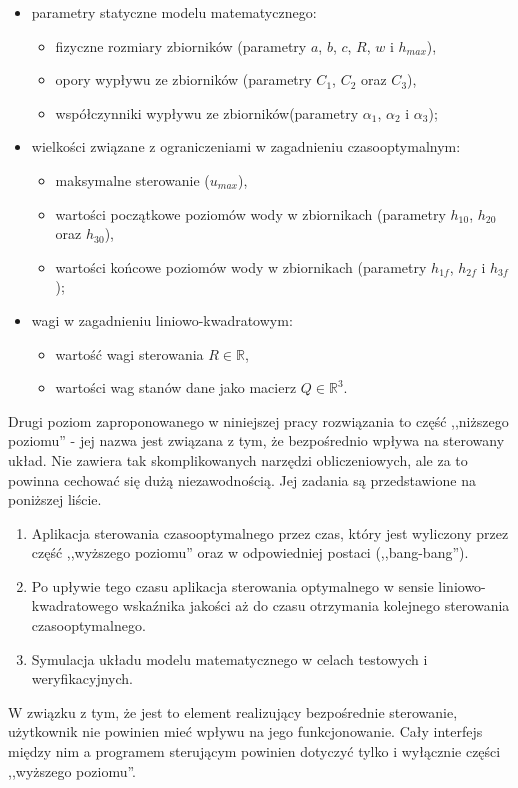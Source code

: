 \begin{itemize}
    \item parametry statyczne modelu matematycznego:
    \begin{itemize}
        \item fizyczne rozmiary zbiorników (parametry $a$, $b$, $c$, $R$, $w$ i $h_{max}$),
        \item opory wypływu ze zbiorników (parametry $C_{1}$, $C_{2}$ oraz $C_{3}$),
        \item współczynniki wypływu ze zbiorników(parametry $\alpha_{1}$, $\alpha_{2}$ i $\alpha_{3}$);
    \end{itemize}
    \item wielkości związane z ograniczeniami w zagadnieniu czasooptymalnym:
    \begin{itemize}
        \item maksymalne sterowanie ($u_{max}$),
        \item wartości początkowe poziomów wody w zbiornikach (parametry $h_{10}$, $h_{20}$ oraz $h_{30}$),
        \item wartości końcowe poziomów wody w zbiornikach (parametry $h_{1f}$, $h_{2f}$ i $h_{3f}$);
    \end{itemize}
    \item wagi w zagadnieniu liniowo-kwadratowym:
    \begin{itemize}
        \item wartość wagi sterowania $R \in \mathbb{R}$,
        \item wartości wag stanów dane jako macierz $Q \in \mathbb{R}^{3}$.
    \end{itemize}
\end{itemize}

Drugi poziom zaproponowanego w niniejszej pracy rozwiązania to część ,,niższego poziomu'' - jej nazwa jest związana z tym, że bezpośrednio wpływa na sterowany układ. Nie zawiera tak skomplikowanych narzędzi obliczeniowych, ale za to powinna cechować się dużą niezawodnością. Jej zadania są przedstawione na poniższej liście.

\begin{enumerate}
    \item Aplikacja sterowania czasooptymalnego przez czas, który jest wyliczony przez część ,,wyższego poziomu'' oraz w odpowiedniej postaci (,,bang-bang'').
    \item Po upływie tego czasu aplikacja sterowania optymalnego w sensie liniowo-kwadratowego wskaźnika jakości aż do czasu otrzymania kolejnego sterowania czasooptymalnego.
    \item Symulacja układu modelu matematycznego w celach testowych i weryfikacyjnych.
\end{enumerate}

W związku z tym, że jest to element realizujący bezpośrednie sterowanie, użytkownik nie powinien mieć wpływu na jego funkcjonowanie. Cały interfejs między nim a programem sterującym powinien dotyczyć tylko i wyłącznie części ,,wyższego poziomu''.
